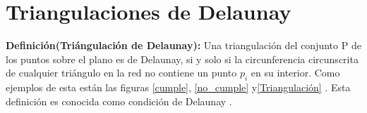 \documentclass[12pt]{report}
\begin{document}

\section{Triangulaciones de Delaunay}
\textbf{Definición(Triángulación de Delaunay):} Una triangulación del conjunto P de los puntos sobre el plano es de Delaunay, si y solo si la circunferencia circunscrita de cualquier triángulo en la red no contiene un punto $p_i$ en su interior. Como ejemplos de esta están las figuras \ref{cumple}, \ref{no_cumple} y\ref{Triangulación} . Esta definición es conocida como condición de Delaunay \cite{26,27,28}.\\    
\end{document}
